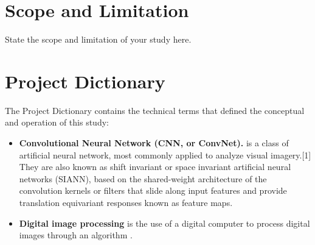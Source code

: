 \begin{refsection}
\section{Scope and Limitation}

State the scope and limitation of your study here.

\section{Project Dictionary}

The Project Dictionary contains the technical terms that defined the conceptual and operation of this study:

\begin{itemize}
    \item \textbf{Convolutional Neural Network (CNN, or ConvNet).} is a class of artificial neural network, most commonly applied to analyze visual imagery.[1] They are also known as shift invariant or space invariant artificial neural networks (SIANN), based on the shared-weight architecture of the convolution kernels or filters that slide along input features and provide translation equivariant responses known as feature maps.
    \item \textbf{Digital image processing} is the use of a digital computer to process digital images through an algorithm \cite{CitekeyUnpublished}. 
\end{itemize}

\clearpage

\printbibliography[heading=subbibintoc, title={\centering Notes}]
\end{refsection}